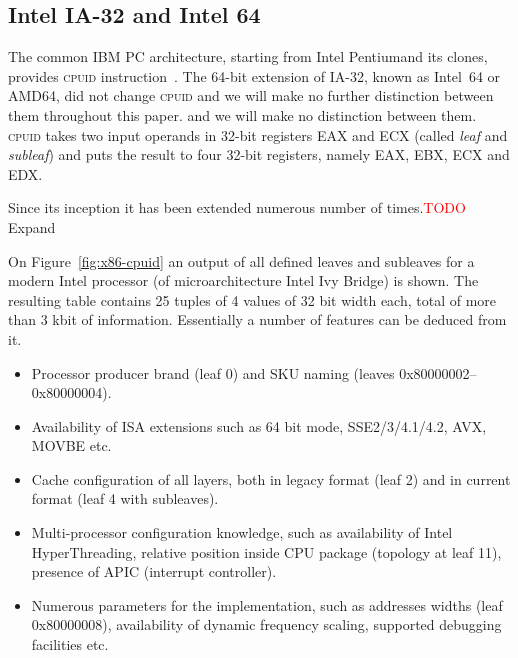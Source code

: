 \documentclass[a4paper,10pt,oneside,unicode]{article}
\newcommand{\cpuid}{\textsc{cpuid} }
\newcommand{\todo}[1][]{\textcolor{red}{TODO #1}}
\begin{document}
\subsection{Intel IA-32 and Intel 64}

The common IBM PC architecture, starting from Intel Pentium\texttrademark and its clones, provides \cpuid instruction~\cite{intelmanual-7vols, amd-sdm-vol1}. The 64-bit extension of IA-32, known as Intel~64 or AMD64, did not change \cpuid and we will make no further distinction between them throughout this paper. and we will make no distinction between them. \cpuid takes two input operands in 32-bit registers EAX and ECX (called \textit{leaf} and \textit{subleaf}) and puts the result to four 32-bit registers, namely EAX, EBX, ECX and EDX.

Since its inception it has been extended numerous number of times.\todo{Expand}

On Figure~\ref{fig:x86-cpuid} an output of all defined leaves and subleaves for a modern Intel processor (of microarchitecture Intel Ivy Bridge) is shown. The resulting table contains 25 tuples of 4 values of 32 bit width each, total of more than 3 kbit of information. Essentially a number of features can be deduced from it.
\begin{itemize}
    \item Processor producer brand (leaf 0) and SKU naming (leaves 0x80000002--0x80000004).
    \item Availability of ISA extensions such as 64 bit mode, SSE2/3/4.1/4.2, AVX, MOVBE etc.
    \item Cache configuration of all layers, both in legacy format (leaf 2) and in current format (leaf 4 with subleaves).
    \item Multi-processor configuration knowledge, such as availability of Intel HyperThreading, relative position inside {CPU} package (topology at leaf 11), presence of {APIC} (interrupt controller).
    \item Numerous parameters for the implementation, such as addresses widths (leaf 0x80000008), availability of dynamic frequency scaling, supported debugging facilities etc.
\end{itemize}
\end{document}
